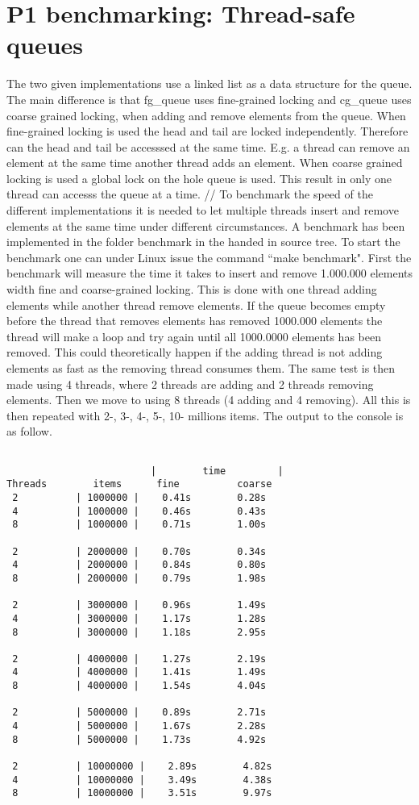 \documentclass[a4paper,12pt,danish]{report}
\begin{document}
\section{P1 benchmarking: Thread-safe queues}
The two given implementations use a linked list as a
data structure for the queue. The main difference is that fg\_queue uses fine-grained locking and
cg\_queue uses coarse grained locking, when adding and remove elements from the
queue. When fine-grained locking is used the head and tail are locked
independently. Therefore can the head and tail be accesssed at the same time.
E.g. a thread can remove an element at the same time another thread adds an
element. When coarse grained locking is used a global lock on the hole queue is used.
This result in only one thread can accesss the queue at a time.
//
To benchmark the speed of the different implementations it is needed to let
multiple threads insert and remove elements at the same time under different
circumstances. A benchmark has been implemented in the folder benchmark in
the handed in source tree. To start the benchmark one can under Linux issue
the command ``make benchmark".
First the benchmark will measure the time it takes to insert and remove 1.000.000
elements width fine and coarse-grained locking. This is done with one thread
adding elements while another thread remove elements.
If the queue becomes empty before the thread that removes elements has
removed 1000.000 elements the thread will  make a loop and try again
until all 1000.0000 elements has been removed. This could theoretically happen
if the adding thread is not adding elements as fast as the removing thread
consumes them. The same test is then made using 4 threads, where 2 threads are
adding and 2 threads removing elements. Then we move to using 8 threads (4
adding and 4 removing). All this is then repeated with 2-, 3-, 4-, 5-, 10-
millions items.
The output to the console is as follow.
\begin{lstlisting}

                         |        time         |
Threads        items      fine          coarse
 2          | 1000000 |    0.41s        0.28s
 4          | 1000000 |    0.46s        0.43s
 8          | 1000000 |    0.71s        1.00s

 2          | 2000000 |    0.70s        0.34s
 4          | 2000000 |    0.84s        0.80s
 8          | 2000000 |    0.79s        1.98s

 2          | 3000000 |    0.96s        1.49s
 4          | 3000000 |    1.17s        1.28s
 8          | 3000000 |    1.18s        2.95s

 2          | 4000000 |    1.27s        2.19s
 4          | 4000000 |    1.41s        1.49s
 8          | 4000000 |    1.54s        4.04s

 2          | 5000000 |    0.89s        2.71s
 4          | 5000000 |    1.67s        2.28s
 8          | 5000000 |    1.73s        4.92s

 2          | 10000000 |    2.89s        4.82s
 4          | 10000000 |    3.49s        4.38s
 8          | 10000000 |    3.51s        9.97s

\end{lstlisting}
\end{document}

